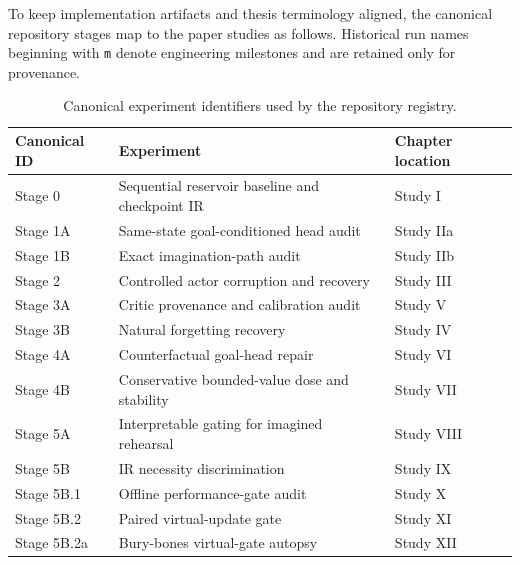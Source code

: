 \documentclass[10pt]{article}
\begin{document}
To keep implementation artifacts and thesis terminology aligned, the
canonical repository stages map to the paper studies as follows. Historical
run names beginning with \texttt{m} denote engineering milestones and are
retained only for provenance.

\begin{table}[H]
\centering
\caption{Canonical experiment identifiers used by the repository registry.}
\label{tab:canonicalstages}
\begin{tabular}{lll}
\toprule
Canonical ID & Experiment & Chapter location \\
\midrule
Stage 0 & Sequential reservoir baseline and checkpoint IR & Study I \\
Stage 1A & Same-state goal-conditioned head audit & Study IIa \\
Stage 1B & Exact imagination-path audit & Study IIb \\
Stage 2 & Controlled actor corruption and recovery & Study III \\
Stage 3A & Critic provenance and calibration audit & Study V \\
Stage 3B & Natural forgetting recovery & Study IV \\
Stage 4A & Counterfactual goal-head repair & Study VI \\
Stage 4B & Conservative bounded-value dose and stability & Study VII \\
Stage 5A & Interpretable gating for imagined rehearsal & Study VIII \\
Stage 5B & IR necessity discrimination & Study IX \\
Stage 5B.1 & Offline performance-gate audit & Study X \\
Stage 5B.2 & Paired virtual-update gate & Study XI \\
Stage 5B.2a & Bury-bones virtual-gate autopsy & Study XII \\
\bottomrule
\end{tabular}
\end{table}
\end{document}
